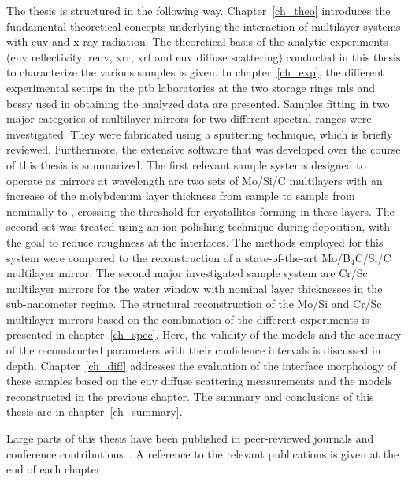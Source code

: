 The thesis is structured in the following way.
Chapter~\ref{ch_theo} introduces the fundamental theoretical concepts underlying
the interaction of multilayer systems with \gls{euv} and x-ray radiation.
The theoretical basis of the analytic experiments (\gls{euv} reflectivity,
\gls{reuv}, \gls{xrr}, \gls{xrf} and \gls{euv} diffuse scattering) conducted in
this thesis to characterize the various samples is given.
In chapter~\ref{ch_exp}, the different experimental setups in the \gls{ptb}
laboratories at the two storage rings \gls{mls} and \gls{bessy} used in
obtaining the analyzed data are presented.
Samples fitting in two major categories of multilayer mirrors for two different
spectral ranges were investigated.
They were fabricated using a sputtering technique, which is briefly reviewed.
Furthermore, the extensive software that was developed over the course of this
thesis is summarized.
The first relevant sample systems designed to operate as mirrors at 
wavelength are two sets of Mo/Si/C multilayers with an increase of the
molybdenum layer thickness from sample to sample from nominally  to
, crossing the threshold for crystallites forming in these layers.
The second set was treated using an ion polishing technique during deposition,
with the goal to reduce roughness at the interfaces.
The methods employed for this system were compared to the reconstruction of a
state-of-the-art Mo/B$_4$C/Si/C multilayer mirror.
The second major investigated sample system are Cr/Sc multilayer mirrors for the
water window with nominal layer thicknesses in the sub-nanometer regime.
The structural reconstruction of the Mo/Si and Cr/Sc multilayer mirrors based on
the combination of the different experiments is presented in
chapter~\ref{ch_spec}.
Here, the validity of the models and the accuracy of the reconstructed
parameters with their confidence intervals is discussed in depth.
Chapter~\ref{ch_diff} addresses the evaluation of the interface morphology of
these samples based on the \gls{euv} diffuse scattering measurements and the
models reconstructed in the previous chapter.
The summary and conclusions of this thesis are in chapter~\ref{ch_summary}.

Large parts of this thesis have been published in peer-reviewed journals and
conference contributions~\cite{haase_role_2014, haase_characterization_2015,
haase_multiparameter_2016, haase_interface_2017}.
A reference to the relevant publications is given at the end of each chapter.
